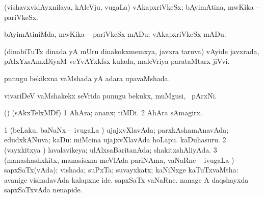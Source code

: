 \bentry 
{} 
\gl{\nA}
\expl{}
\bmng
 (vishavxvidAyxnilaya, kAleVju, \mo vugaLa) vAkapxriVkeSx; bAyimAtina, mwKika -- pariVkeSx. 
\emng
\eentry

\bentry 
{}  
\gl{\sakirx}
\bmng
bAyimAtiniMda, mwKika -- pariVkeSx mADu; vAkapxriVkeSx mADu. 
\emng
\eentry

\bentry 
{} 
\gl{\nA}
\expl{}
\bmng
 (dinabiTuTx dinada yA mUru dinakokxmemxya, javxra taruva) vAyide javxrada, pAlxYxsAmxDiyaM veYvAYxkfsx kulada, maleVriya parataMtarx jiVvi. 
\emng
\eentry

\bentry 
{} 
\gl{\gu}
\expl{}
\bmng
 punugu bekikxna vaMshada yA adara upavaMshada. 
\emng
\eentry

\bentry 
{} 
\gl{\nA}
\expl{}
\bmng
 vivariDeV vaMshakekx seVrida punugu bekukx, muMgusi, \mo\ pArxNi. 
\emng
\eentry

\bentry
{} 
\gl{\nA}
\expl{}
\bmng
 (\bava) (sAkxTelxMDf) 
\bnum
\num{1} AhAra; ananx; tiMDi. 
\num{2} AhAra sAmagirx. 
\enum
\emng
\eentry

\bentry 
{} 
\gl{\gu}
\expl{}
\bmng
\bnum
\num{1} (beLaku, baNaNx -- ivugaLa \vi) ujajxvXlavAda; parxkAshamAnavAda; edudxkANuva; kaDu:  miMcina ujajxvXlavAda hoLapu.  kaDuhasuru. 
\num{2} (vayxkitxya \vi) lavalavikeya; ulAlxsaBaritanAda; shakitxshAliyAda. 
\num{3} (manashashxkitx, manasisxna meVlAda pariNAma, vaNaRne -- ivugaLa \vi) sapxSaTx(vAda); vishada; suPxTa; suvayxkatx; kaNiNxge kaTuTxvaMtha:  avanige vishadavAda kalapxne ide.  sapxSaTx vaNaRne.  nanage A daqshayxda sapxSaTxvAda nenapide. 
\enum
\emng
\eentry

